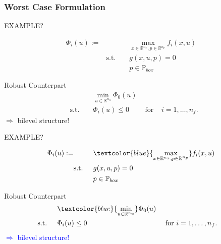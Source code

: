 \begin{frame}
\frametitle{Worst Case Formulation}
\begin{overprint}
EXAMPLE?



\begin{align*}
\Phi_{i}(u):= &&& \max_{x\in \mathbb{R}^{n_{x}}, p\in \mathbb{R}^{n_{p}}} f_{i}(x,u)\\
& \text{s.t. } && g(x,u,p)=0\\
&&& p\in\mathbb{P}_{box}
\end{align*}

\begin{block}{Robust Counterpart}
\begin{align*}
&&&\min_{u\in\mathbb{R}^{n_{u}}} \Phi_{0}(u)\\
&\text{s.t. } &&\Phi_{i}(u)\leq 0 & \text{ for } & i=1,\ldots,n_{f}.
\end{align*}
$\Rightarrow$ bilevel structure!
\end{block}

EXAMPLE?

\begin{align*}
\Phi_{i}(u):= &&& \textcolor{blue}{\max_{x\in \mathbb{R}^{n_{x}}, p\in \mathbb{R}^{n_{p}}}} f_{i}(x,u)\\
& \text{s.t. } && g(x,u,p)=0\\
&&& p\in\mathbb{P}_{box}
\end{align*}

\begin{block}{Robust Counterpart}
	\begin{align*}
	&&&\textcolor{blue}{\min_{u\in\mathbb{R}^{n_{u}}}} \Phi_{0}(u)\\
	&\text{s.t. } &&\Phi_{i}(u)\leq 0 & \text{ for } & i=1,\ldots,n_{f}.
	\end{align*}
	\textcolor{blue}{$\Rightarrow$ bilevel structure!}
\end{block}

\end{overprint}

\end{frame}

